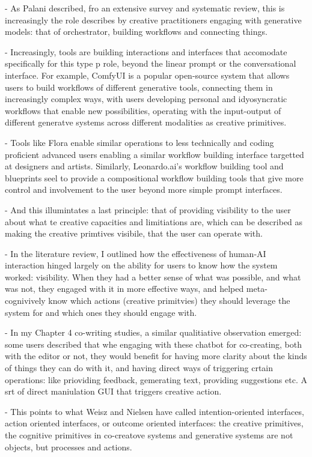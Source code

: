 - As Palani described, fro an extensive survey and systematic review, this is increasingly the role describes by creative practitioners engaging with generative models: that of orchestrator, building workflows and connecting things. 


- Increasingly, tools are building interactions and interfaces that accomodate specifically for this type p role, beyond the linear prompt or the conversational interface. For example, ComfyUI is a popular open-source system that allows users to build workflows of different generative tools, connecting them in increasingly complex ways, with users developing personal and idyosyncratic workflows that enable new possibilities, operating with the input-output of different generatve systems across different modalities as creative primitives. 

- Tools like Flora enable similar operations to less technically and coding proficient advanced users enabling a similar workflow building interface targetted at designers and artists. Similarly, Leonardo.ai's workflow building tool and blueprints seel to provide a compositional workflow building tools that give more control and involvement to the user beyond more simple prompt interfaces. 

- And this illumintates a last principle: that of providing visibility to the user about what te creative capacities and limitiations are, which can be described as making the creative primtives visibile, that the user can operate with. 

- In the literature review, I outlined how the effectiveness of human-AI interaction hinged largely on the ability for users to know how the system worked: visibility. When they had a better sense of what was possible, and what was not, they engaged with it in more effective ways, and helped meta-cognivively know which actions (creative primitvies) they should leverage the system for and which ones they should engage with. 

- In my Chapter 4 co-writing studies, a similar qualitiative observation emerged: some users described that whe engaging with these chatbot for co-creating, both with the editor or not, they would benefit for having more clarity about the kinds of things they can do with it, and having direct ways of triggering crtain operations: like prioviding feedback, gemerating text, providing suggestions etc. A srt of direct maniulation GUI that triggers creative action. 

- This points to what Weisz and Nielsen have called intention-oriented interfaces, action oriented interfaces, or outcome oriented interfaces: the creative primitives, the cognitive primitives in co-creatove systems and generative systems are not objects, but processes and actions. 

